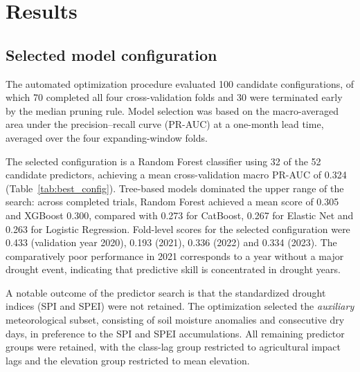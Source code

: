 \section{Results}

\subsection{Selected model configuration}

The automated optimization procedure evaluated 100 candidate configurations, of
which 70 completed all four cross-validation folds and 30 were terminated early
by the median pruning rule. Model selection was based on the macro-averaged
area under the precision--recall curve (PR-AUC) at a one-month lead time,
averaged over the four expanding-window folds.

The selected configuration is a Random Forest classifier using 32 of the 52
candidate predictors, achieving a mean cross-validation macro PR-AUC of 0.324
(Table~\ref{tab:best_config}). Tree-based models dominated the upper range of
the search: across completed trials, Random Forest achieved a mean score of
0.305 and XGBoost 0.300, compared with 0.273 for CatBoost, 0.267 for Elastic
Net and 0.263 for Logistic Regression. Fold-level scores for the selected
configuration were 0.433 (validation year 2020), 0.193 (2021), 0.336 (2022) and
0.334 (2023). The comparatively poor performance in 2021 corresponds to a year
without a major drought event, indicating that predictive skill is concentrated
in drought years.

A notable outcome of the predictor search is that the standardized drought
indices (SPI and SPEI) were not retained. The optimization selected the
\textit{auxiliary} meteorological subset, consisting of soil moisture anomalies
and consecutive dry days, in preference to the SPI and SPEI accumulations.
All remaining predictor groups were retained, with the class-lag group
restricted to agricultural impact lags and the elevation group restricted to
mean elevation.


